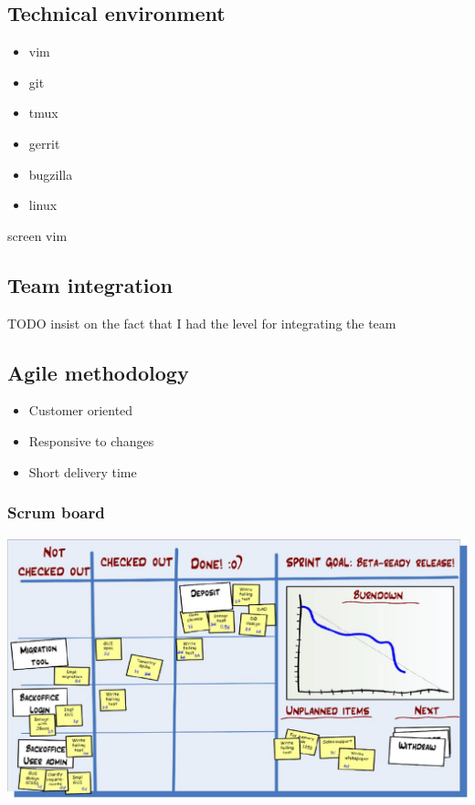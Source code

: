 \subsection{Technical environment}
\begin{FrameWithSubSection}
    \begin{itemize}
        \item vim
        \item git
        \item tmux
        \item gerrit
        \item bugzilla
        \item linux
    \end{itemize}
\end{FrameWithSubSection}
\begin{FrameWithSubSection}
    \begin{block}
        screen vim
    \end{block}
\end{FrameWithSubSection}

\subsection{Team integration}
\begin{FrameWithSubSection}
    TODO insist on the fact that I had the level for integrating the team
\end{FrameWithSubSection}

\subsection{Agile methodology}
\begin{FrameWithSubSection}
    \begin{itemize}
        \item Customer oriented
        \item Responsive to changes
        \item Short delivery time
    \end{itemize}
\end{FrameWithSubSection}

\begin{FrameWithSubSection}
    \frametitle {Scrum board}
    \includegraphics[width=\textwidth]{../../report/src/img/taskboard.jpg}
\end{FrameWithSubSection}

